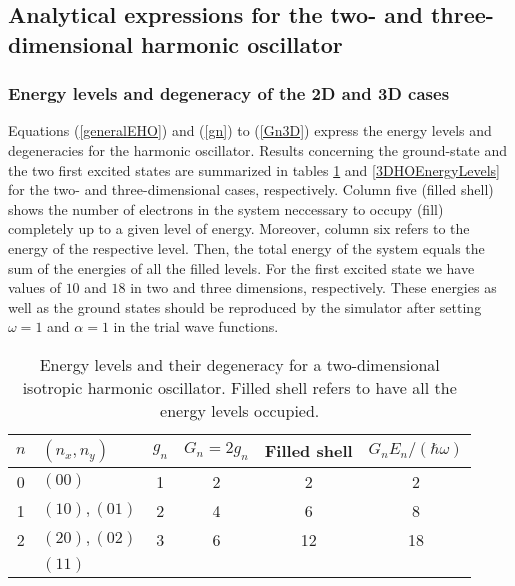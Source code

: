 \subsection{Analytical expressions for the two- and three-dimensional harmonic oscillator}
\subsubsection{Energy levels and degeneracy of the 2D and 3D cases}
Equations (\ref{generalEHO}) and (\ref{gn}) to (\ref{Gn3D}) express the energy levels and degeneracies for the harmonic oscillator. Results concerning the ground-state and the two first excited states are summarized in tables \ref{2DHOEnergyLevels} and \ref{3DHOEnergyLevels} for the two- and three-dimensional cases, respectively. Column five (filled shell) shows the number of electrons in the system neccessary to occupy (fill) completely up to a given level of energy. Moreover, column six refers to the energy of the respective level. Then, the total energy of the system equals the sum of the energies of all the filled levels. For the first excited state we have values of $10$ and $18$ in two and three dimensions, respectively. These energies as well as the ground states should be reproduced by the simulator after setting $\omega = 1$ and $\alpha = 1$ in the trial wave functions.
\begin{table}%
\begin{center} 
\begin{tabular}{clcccc}
\toprule[1pt]
$n$  & $(n_x,n_y)$  & $g_n$  & $G_n\! = \!2g_n$ & Filled shell & $G_n E_n/(\hbar \omega)$ 	\\
\midrule[1pt]	
0		& $(00)$ 	&   1    & 2            &       2  	            	& 2\\
1		& $(10), (01)$  &   2	 & 4            &       6  	               	& 8\\
2               & $(20), (02)$  &   3    & 6            &       12  	          	& 18\\ 
		& $(11)$     	&        &              &                      		& \\
\bottomrule[1pt]
\end{tabular} 
\end{center}
\caption{Energy levels and their degeneracy for a two-dimensional isotropic harmonic oscillator. Filled shell refers to have all the energy levels occupied.}
\label{2DHOEnergyLevels}
\end{table}

